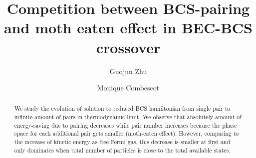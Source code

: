 \documentclass[aps,prb,showpacs,reprint]{revtex4-1}
\begin{document}
\title{Competition between BCS-pairing and moth eaten effect in BEC-BCS crossover}
\author{Guojun Zhu}
\author{Monique Combescot}


\newcommand{\td}{{\ensuremath{{\text{(2D)}}}}}
\newcommand{\sd}{{\ensuremath{{\text{(3D)}}}}}
\newcommand{\Arctg}{\ensuremath{\text{Arctg}}}



\begin{abstract}
We study the evolution of solution to reduced BCS hamiltonian from single pair to infinite amount of pairs in thermodynamic limit.  We observe that absolutely amount of energy-saving due to pairing decreases while pair number increases because the phase space for each additional pair gets smaller (moth-eaten effect).  However, comparing to the increase of kinetic energy as free Fermi gas, this decrease is smaller at first and only dominates  when total number of particles is close to the total available states.  
\end{abstract}
\maketitle
\end{document}

